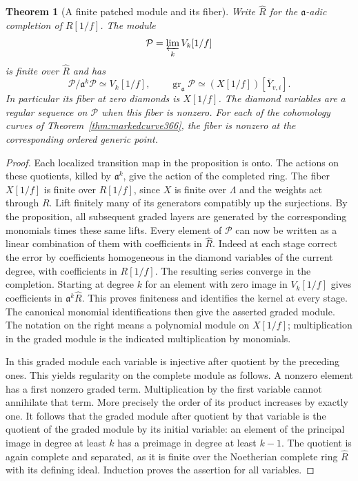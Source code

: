 \documentclass[a4paper,11pt]{article}
\newtheorem{theorem}[proposition]{Theorem}
\theoremstyle{definition}
\theoremstyle{remark}
\numberwithin{equation}{section}
\begin{document}
\begin{theorem}[A finite patched module and its fiber]\leavevmode
\label{thm:modulepatch408}
Write \(\widehat R\) for the \(\mathfrak a\)-adic completion
of \(R[1/f]\). The module
\[
                  \mathcal P=\varprojlim_k V_k[1/f]
\]
is finite over \(\widehat R\) and has
\[
 \mathcal P/\mathfrak a^k\mathcal P\simeq V_k[1/f],
 \qquad
 \operatorname{gr}_{\mathfrak a}\mathcal P
        \simeq (X[1/f])[\overline Y_{v,i}].
\]
In particular its fiber at zero diamonds is \(X[1/f]\).
The diamond variables are a regular sequence on \(\mathcal P\)
when this fiber is nonzero. For each of the cohomology curves
of Theorem~\ref{thm:markedcurve366}, the fiber is nonzero
at the corresponding ordered generic point.
\end{theorem}
\begin{proof}
Each localized transition map in the proposition is onto.
The actions on these quotients, killed by \(\mathfrak a^k\),
give the action of the completed ring. The fiber \(X[1/f]\)
is finite over \(R[1/f]\), since \(X\) is finite over
\(\Lambda\) and the weights act through \(R\).
Lift finitely many of its generators compatibly up the
surjections. By the proposition, all subsequent graded
layers are generated by the corresponding monomials
times these same lifts. Every element of \(\mathcal P\)
can now be written as a linear combination of them with
coefficients in \(\widehat R\). Indeed at each stage correct
the error by coefficients homogeneous in the diamond
variables of the current degree, with coefficients in
\(R[1/f]\). The resulting series converge in the completion.
Starting at degree \(k\) for an element with zero image in
\(V_k[1/f]\) gives coefficients in \(\mathfrak a^k\widehat R\).
This proves finiteness and identifies the kernel at every
stage. The canonical monomial identifications then give the
asserted graded module. The notation on the right means a
polynomial module on \(X[1/f]\); multiplication in the
graded module is the indicated multiplication by monomials.

In this graded module each variable is injective after
quotient by the preceding ones. This yields regularity on
the complete module as follows. A nonzero element has a
first nonzero graded term. Multiplication by the first
variable cannot annihilate that term. More precisely the
order of its product increases by exactly one. It follows
that the graded module after quotient by that variable is
the quotient of the graded module by its initial variable:
an element of the principal image in degree at least \(k\)
has a preimage in degree at least \(k-1\). The quotient is
again complete and separated, as it is finite over the
Noetherian complete ring \(\widehat R\) with its defining
ideal. Induction proves the assertion for all variables.


\end{proof}
\end{document}
